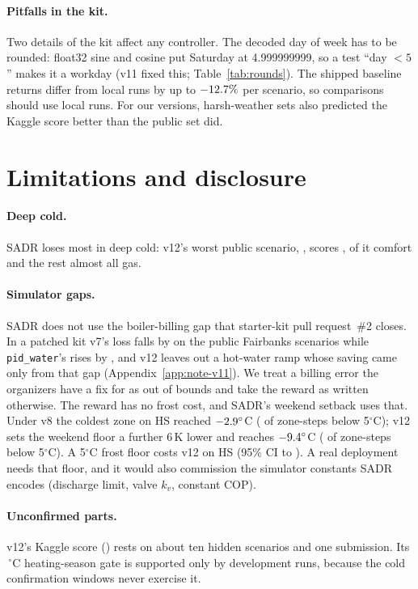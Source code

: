 \documentclass{article}
\begin{document}
\paragraph{Pitfalls in the kit.} Two details of the kit affect any controller. The decoded day of week has to be rounded: float32 sine and cosine put Saturday at 4.999999999, so a test ``day $<5$'' makes it a workday (v11 fixed this; Table~\ref{tab:rounds}). The shipped baseline returns differ from local runs by up to $-12.7\%$ per scenario, so comparisons should use local runs. For our versions, harsh-weather sets also predicted the Kaggle score better than the public set did.

\section{Limitations and disclosure}
\label{sec:limits}
\paragraph{Deep cold.} SADR loses most in deep cold: v12's worst public scenario, \RElvWorstPubScen, scores \RElvWorstPub, \RElvWorstPubComfortShare{} of it comfort and the rest almost all gas.

\paragraph{Simulator gaps.} SADR does not use the boiler-billing gap that starter-kit pull request~\#2 closes. In a patched kit v7's loss falls by \RFivePrTwoVSevenRelAbs{} on the \RFivePrTwoVSevenN{} public Fairbanks scenarios while \texttt{pid\_water}'s rises by \RFivePrTwoPidRelAbs, and v12 leaves out a hot-water ramp whose saving came only from that gap (Appendix~\ref{app:note-v11}). We treat a billing error the organizers have a fix for as out of bounds and take the reward as written otherwise. The reward has no frost cost, and SADR's weekend setback uses that. Under v8 the coldest zone on HS reached $-2.9^\circ$C (\RSixDecBelowFive{} of zone-steps below 5$^\circ$C); v12 sets the weekend floor a further 6\,K lower and reaches $-9.4^\circ$C (\RElvBelowFiveHS{} of zone-steps below 5$^\circ$C). A 5$^\circ$C frost floor costs v12 \RElvFrostHsRel{} on HS (95\% CI \RElvFrostHsLo{} to \RElvFrostHsHi). A real deployment needs that floor, and it would also commission the simulator constants SADR encodes (discharge limit, valve $k_v$, constant COP).

\paragraph{Unconfirmed parts.} v12's Kaggle score (\RTenKagVTwelve) rests on about ten hidden scenarios and one submission. Its \RTenSeasonOatC\,$^\circ$C heating-season gate is supported only by development runs, because the cold confirmation windows never exercise it.
\end{document}
